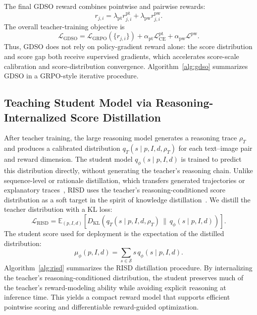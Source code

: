 \documentclass{llmxive}
\providecommand{\KL}{D_{\mathrm{KL}}}
\providecommand{\teaname}{GDSO\xspace}
\providecommand{\stuname}{RISD\xspace}
\begin{document}
The final GDSO reward combines pointwise and pairwise rewards:
\begin{equation}
r_{j,i}
=
\lambda_{\mathrm{pt}} r^{\mathrm{pt}}_{j,i}
+
\lambda_{\mathrm{pw}} r^{\mathrm{pw}}_{j,i}.
\label{eq:gdso-reward}
\end{equation}
The overall teacher-training objective is
\begin{equation}
\mathcal{L}_{\mathrm{GDSO}}
=
\mathcal{L}_{\mathrm{GRPO}}(\{r_{j,i}\})
+
\alpha_{\mathrm{pt}}\mathcal{L}^{\mathrm{pt}}_{\mathrm{CE}}
+
\alpha_{\mathrm{pw}}\mathcal{L}^{\mathrm{pw}}.
\label{eq:gdso-objective}
\end{equation}
Thus, \teaname does not rely on policy-gradient reward alone: the score distribution and score gap both receive supervised gradients, which accelerates score-scale calibration and score-distribution convergence. Algorithm~\ref{alg:gdso} summarizes \teaname in a GRPO-style iterative procedure.

\subsection{Teaching Student Model via Reasoning-Internalized Score Distillation}

After teacher training, the large reasoning model generates a reasoning trace $\rho_T$ and produces a calibrated distribution $q_T(s \mid p,I,d,\rho_T)$ for each text--image pair and reward dimension. The student model $q_\phi(s \mid p,I,d)$ is trained to predict this distribution directly, without generating the teacher's reasoning chain. Unlike sequence-level or rationale distillation, which transfers generated trajectories or explanatory traces~\cite{kim2016sequence,hsieh2023distilling}, \stuname uses the teacher's reasoning-conditioned score distribution as a soft target in the spirit of knowledge distillation~\cite{hinton2015distilling}. We distill the teacher distribution with a KL loss:
\begin{equation}
\mathcal{L}_{\mathrm{RISD}}
=
\mathbb{E}_{(p,I,d)}
\left[
\KL\!\left(
q_T(s \mid p,I,d,\rho_T)\,\|\,q_\phi(s \mid p,I,d)
\right)
\right].
\label{eq:risd-loss}
\end{equation}
The student score used for deployment is the expectation of the distilled distribution:
\begin{equation}
\mu_\phi(p,I,d)
=
\sum_{s \in \mathcal{S}} s \, q_\phi(s \mid p,I,d).
\label{eq:student-expected-score}
\end{equation}
Algorithm~\ref{alg:risd} summarizes the \stuname distillation procedure. By internalizing the teacher's reasoning-conditioned distribution, the student preserves much of the teacher's reward-modeling ability while avoiding explicit reasoning at inference time. This yields a compact reward model that supports efficient pointwise scoring and differentiable reward-guided optimization.
\end{document}
